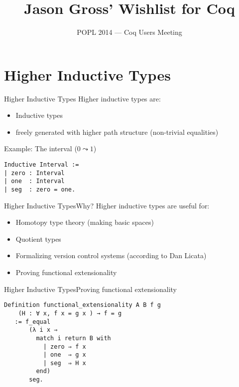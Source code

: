 \documentclass{beamer}
\title{Jason Gross' Wishlist for Coq}
\date{POPL 2014 --- Coq Users Meeting}
\begin{document}
\begin{frame}
\maketitle
\end{frame}

\begin{frame}
\tableofcontents
\end{frame}

\section{Higher Inductive Types}

\begin{frame}[fragile]{Higher Inductive Types}
  \Large
  Higher inductive types are: \pause
  \begin{itemize}
    \item Inductive types \pause
    \item freely generated with higher path structure (non-trivial equalities) \pause
  \end{itemize}
  
  Example: The interval ($0 \leadsto 1$) \pause
\begin{verbatim}
Inductive Interval :=
| zero : Interval
| one  : Interval
| seg  : zero = one. 
\end{verbatim}
\end{frame}

\begin{frame}[fragile]{Higher Inductive Types}{Why?}
  \Large
  Higher inductive types are useful for: \pause
  \begin{itemize}
    \item Homotopy type theory (making basic spaces)\pause
    \item Quotient types \pause
    \item Formalizing version control systems (according to Dan Licata)
    \item Proving functional extensionality
  \end{itemize}
\end{frame}

\begin{frame}[fragile]{Higher Inductive Types}{Proving functional extensionality}
  \Large
\begin{verbatim}
Definition functional_extensionality A B f g
    (H : ∀ x, f x = g x ) → f = g
   := f_equal
       (λ i x ⇒
         match i return B with
           | zero ⇒ f x
           | one  ⇒ g x
           | seg  ⇒ H x
         end)
       seg.
\end{verbatim}
\end{frame}
\end{document}
